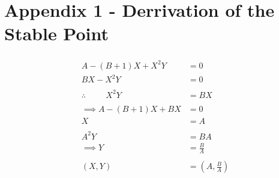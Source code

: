 \documentclass[reprint, amsmath, amssymb, aps]{revtex4-2}
\begin{document}
\section*{Appendix 1 - Derrivation of the Stable Point}
\begin{align*}
	\begin{aligned}
	A - (B + 1)X + X^2 Y &= 0\\
	BX - X^2 Y &= 0\\
	\\
	\therefore \hspace{1cm} X^2 Y &= BX\\
	\\
	\implies A - (B + 1)X + BX &= 0\\
	X &= A\\
	\\
	A^2 Y &= BA\\
	\implies Y &= \frac{B}{A}\\
	\\
	(X, Y) &= \left(A, \frac{B}{A}\right)
	\end{aligned}
\end{align*}
\end{document}
